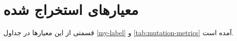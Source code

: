 \chapter{معیارهای استخراج شده}
قسمتی از این معیارها در جداول \ref{my-label} و 	\ref{tab:mutation-metrics} آمده است. 
{ \tiny
	
\begin{latin}
	
\end{latin}

}
 

